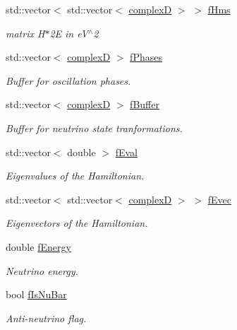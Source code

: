 \begin{DoxyCompactItemize}
std\+::vector$<$ std\+::vector$<$ \hyperlink{EigenPoint_8h_a67ca8e107e20610c3fff78d5e726ece0}{complexD} $>$ $>$ \hyperlink{classOscProb_1_1PMNS__Base_acd3c8783e7603081eab316ea4c86c766}{f\+Hms}
\begin{DoxyCompactList}\small\item\em matrix H$\ast$2E in e\+V$^\wedge$2 \end{DoxyCompactList}\item 
std\+::vector$<$ \hyperlink{EigenPoint_8h_a67ca8e107e20610c3fff78d5e726ece0}{complexD} $>$ \hyperlink{classOscProb_1_1PMNS__Base_ab8d26b722047d49d977f5f2d83026ede}{f\+Phases}
\begin{DoxyCompactList}\small\item\em Buffer for oscillation phases. \end{DoxyCompactList}\item 
std\+::vector$<$ \hyperlink{EigenPoint_8h_a67ca8e107e20610c3fff78d5e726ece0}{complexD} $>$ \hyperlink{classOscProb_1_1PMNS__Base_a5440bc3efa466a37649601abce559e3e}{f\+Buffer}
\begin{DoxyCompactList}\small\item\em Buffer for neutrino state tranformations. \end{DoxyCompactList}\item 
std\+::vector$<$ double $>$ \hyperlink{classOscProb_1_1PMNS__Base_a6319c34d7decbb9d7d6da279c06e8c2d}{f\+Eval}
\begin{DoxyCompactList}\small\item\em Eigenvalues of the Hamiltonian. \end{DoxyCompactList}\item 
std\+::vector$<$ std\+::vector$<$ \hyperlink{EigenPoint_8h_a67ca8e107e20610c3fff78d5e726ece0}{complexD} $>$ $>$ \hyperlink{classOscProb_1_1PMNS__Base_a87be137356c5f27ab83cab5e1298ef8f}{f\+Evec}
\begin{DoxyCompactList}\small\item\em Eigenvectors of the Hamiltonian. \end{DoxyCompactList}\item 
double \hyperlink{classOscProb_1_1PMNS__Base_a2800af6d436972f3e900867790c046b0}{f\+Energy}
\begin{DoxyCompactList}\small\item\em Neutrino energy. \end{DoxyCompactList}\item 
bool \hyperlink{classOscProb_1_1PMNS__Base_a0ebaeaefab36a3ff381c6293faedfdd6}{f\+Is\+Nu\+Bar}
\begin{DoxyCompactList}\small\item\em Anti-\/neutrino flag. \end{DoxyCompactList}\item 

\end{DoxyCompactItemize}
